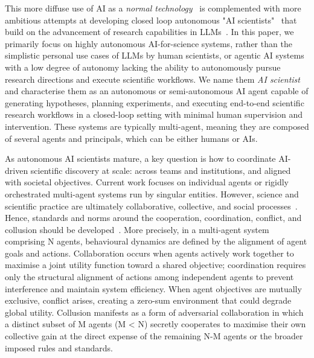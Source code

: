 \documentclass[11pt, a4paper, twocolumn, goog]{google}
\begin{document}
This more diffuse use of AI as a \emph{normal technology}~\citep{narayanan2025ai} is complemented with more ambitious attempts at developing closed loop autonomous "AI scientists"~\citep{lu2024aiscientistfullyautomated, yamada2025ai, tang2025airesearcherautonomousscientificinnovation, wei2025aiscienceagenticscience, Lu2026, ding2026autonomousresearchagentssurvey} that build on the advancement of research capabilities in LLMs~\citep{boiko2023emergent}. In this paper, we primarily focus on highly autonomous AI-for-science systems, rather than the simplistic personal use cases of LLMs by human scientists, or agentic AI systems~\citep{kasirzadeh2026agentic} with a low degree of autonomy lacking the ability to autonomously pursue research directions and execute scientific workflows. We name them \emph{AI scientist} and characterise them as an autonomous or semi-autonomous AI agent capable of generating hypotheses, planning experiments, and executing end-to-end scientific research workflows in a closed-loop setting with minimal human supervision and intervention. These systems are typically multi-agent, meaning they are composed of several agents and principals, which can be either humans or AIs.

As autonomous AI scientists mature, a key question is how to coordinate AI-driven scientific discovery at scale: across teams and institutions, and aligned with societal objectives. Current work focuses on individual agents or rigidly orchestrated multi-agent systems run by singular entities. However, science and scientific practice are ultimately collaborative, collective, and social processes~\citep{channing2026ai}. Hence, standards and norms around the cooperation, coordination, conflict, and collusion should be developed~\citep{hammond2025multi}. More precisely, in a multi-agent system comprising N agents, behavioural dynamics are defined by the alignment of agent goals and actions. Collaboration occurs when agents actively work together to maximise a joint utility function toward a shared objective; coordination requires only the structural alignment of actions among independent agents to prevent interference and maintain system efficiency. When agent objectives are mutually exclusive, conflict arises, creating a zero-sum environment that could degrade global utility. Collusion manifests as a form of adversarial collaboration in which a distinct subset of M agents (M < N) secretly cooperates to maximise their own collective gain at the direct expense of the remaining N-M agents or the broader imposed rules and standards.
\end{document}
